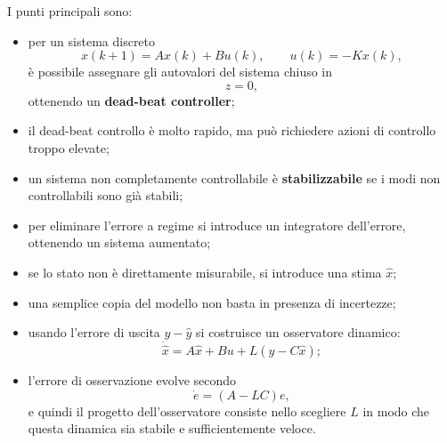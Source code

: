 I punti principali sono:
\begin{itemize}
    \item per un sistema discreto
    \[
    x(k+1)=Ax(k)+Bu(k),
    \qquad
    u(k)=-Kx(k),
    \]
    è possibile assegnare gli autovalori del sistema chiuso in
    \[
    z=0,
    \]
    ottenendo un \textbf{dead-beat controller};

    \item il dead-beat controllo è molto rapido, ma può richiedere azioni di controllo troppo elevate;

    \item un sistema non completamente controllabile è \textbf{stabilizzabile}
    se i modi non controllabili sono già stabili;

    \item per eliminare l'errore a regime si introduce un integratore dell'errore,
    ottenendo un sistema aumentato;

    \item se lo stato non è direttamente misurabile, si introduce una stima \(\hat x\);

    \item una semplice copia del modello non basta in presenza di incertezze;

    \item usando l'errore di uscita \(y-\hat y\) si costruisce un osservatore dinamico:
    \[
    \dot{\hat x}=A\hat x+Bu+L(y-C\hat x);
    \]

    \item l'errore di osservazione evolve secondo
    \[
    \dot e=(A-LC)e,
    \]
    e quindi il progetto dell'osservatore consiste nello scegliere \(L\)
    in modo che questa dinamica sia stabile e sufficientemente veloce.
\end{itemize}